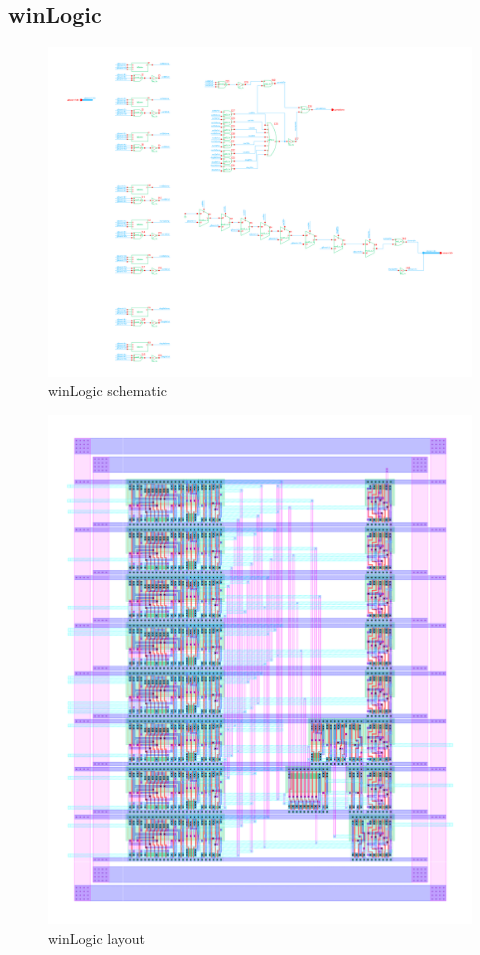 \documentclass[]{article}
\begin{document}
\subsection{winLogic}
\begin{figure}[H]
\centering
\includegraphics[width=.9\textwidth]{winLogic-schematic}
\caption{winLogic schematic}
\label{fig:winLogic-schematic}
\end{figure}

\begin{figure}[H]
\centering
\includegraphics[width=.9\textwidth]{winLogic-layout}
\caption{winLogic layout}
\label{fig:winLogic-layout}
\end{figure}
\end{document}
